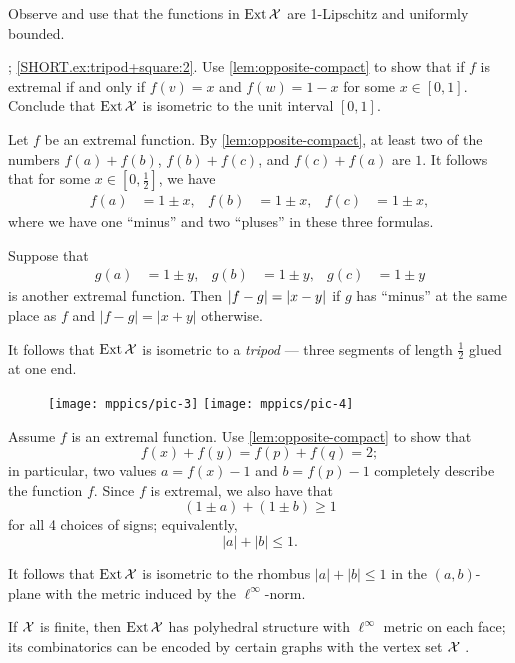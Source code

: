 Observe and use that the functions in $\mathop{\rm Ext}\nolimits\mathcal{X}$ are 1-Lipschitz and uniformly bounded.

\parbf{\ref{ex:tripod+square}}; \ref{SHORT.ex:tripod+square:2}.
Use \ref{lem:opposite-compact} to show that if $f$ is extremal if and only if $f(v)=x$ and $f(w)=1-x$ for some $x\in [0,1]$.
Conclude that $\mathop{\rm Ext}\nolimits\mathcal{X}$ is isometric to the unit interval $[0,1]$.

Let $f$ be an extremal function.
By \ref{lem:opposite-compact}, at least two of the numbers $f(a)+f(b)$, $f(b)+f(c)$, and $f(c)+f(a)$ are $1$.
It follows that for some $x\in[0,\tfrac12]$, we have 
\begin{align*}
f(a)&=1\pm x,&
f(b)&=1\pm x,&
f(c)&=1\pm x,
\end{align*}
where we have one ``minus'' and two ``pluses'' in these three formulas.

Suppose that
\begin{align*}
g(a)&=1\pm y,& g(b)&=1\pm y,& g(c)&=1\pm y
\end{align*}
is another extremal function.
Then $|f-g|\z=|x-y|$ if $g$ has ``minus'' at the same place as $f$ and $|f-g|=|x+y|$ otherwise.

It follows that $\mathop{\rm Ext}\nolimits\mathcal{X}$ is isometric to a {}\emph{tripod} --- three segments of length $\tfrac12$ glued at one end.

\begin{wrapfigure}{r}{30 mm}
\vskip-0mm
\centering
\texttt{[image: mppics/pic-3]}
\bigskip
\texttt{[image: mppics/pic-4]}
\end{wrapfigure}

Assume $f$ is an extremal function.
Use \ref{lem:opposite-compact} to show that
\[f(x)+f(y)=f(p)+f(q)=2;\]
in particular, two values $a=f(x)-1$ and $b=f(p)-1$ completely describe the function $f$.
Since $f$ is extremal, we also have that 
\[(1\pm a)+(1\pm b)\ge 1\]
for all 4 choices of signs;
equivalently, 
\[|a|+|b|\le 1.\]

It follows that $\mathop{\rm Ext}\nolimits\mathcal{X}$ is isometric to the rhombus $|a|+|b|\le 1$ in the $(a,b)$-plane with the metric induced by the $\ell^\infty$-norm.

If $\mathcal{X}$ is finite, then $\mathop{\rm Ext}\nolimits\mathcal{X}$ has polyhedral structure with $\ell^\infty$ metric on each face;
its combinatorics can be encoded by certain graphs with the vertex set $\mathcal{X}$ \cite[see Section 4 in][]{lang-2013}.

